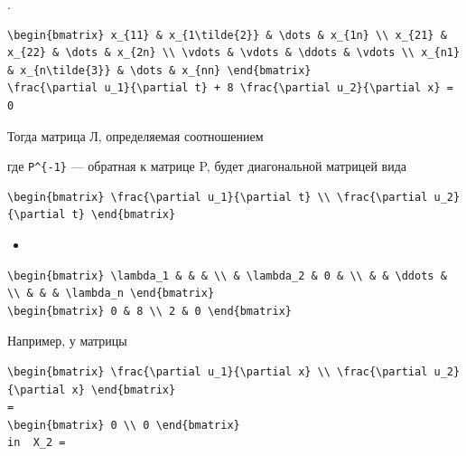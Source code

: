 \documentclass[
  ukrainian,
]{article}
\providecommand{\tightlist}{%
  \setlength{\itemsep}{0pt}\setlength{\parskip}{0pt}}
\begin{document}
.

\begin{verbatim}
\begin{bmatrix} x_{11} & x_{1\tilde{2}} & \dots & x_{1n} \\ x_{21} & x_{22} & \dots & x_{2n} \\ \vdots & \vdots & \ddots & \vdots \\ x_{n1} & x_{n\tilde{3}} & \dots & x_{nn} \end{bmatrix}
\frac{\partial u_1}{\partial t} + 8 \frac{\partial u_2}{\partial x} = 0
\end{verbatim}

Тогда матрица Л, определяемая соотношением

где \texttt{P\^{}\{-1\}} --- обратная к матрице P, будет диагональной
матрицей вида

\begin{verbatim}
\begin{bmatrix} \frac{\partial u_1}{\partial t} \\ \frac{\partial u_2}{\partial t} \end{bmatrix}
\end{verbatim}

\begin{itemize}
\tightlist
\item
\end{itemize}

\begin{verbatim}
\begin{bmatrix} \lambda_1 & & & \\ & \lambda_2 & 0 & \\ & & \ddots & \\ & & & \lambda_n \end{bmatrix}
\begin{bmatrix} 0 & 8 \\ 2 & 0 \end{bmatrix}
\end{verbatim}

Например, у матрицы

\begin{verbatim}
\begin{bmatrix} \frac{\partial u_1}{\partial x} \\ \frac{\partial u_2}{\partial x} \end{bmatrix}
=
\begin{bmatrix} 0 \\ 0 \end{bmatrix}
in  X_2 =
\end{verbatim}
\end{document}
